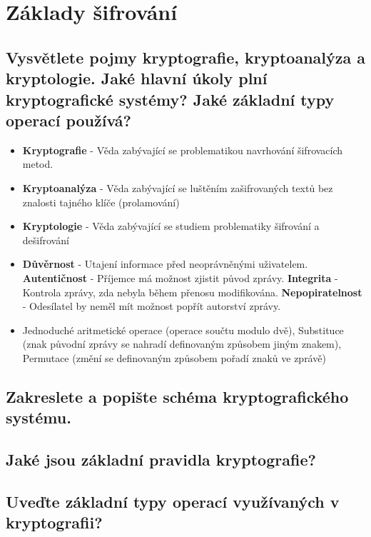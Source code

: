\clearpage
\section{Základy šifrování}
\subsection{Vysvětlete pojmy kryptografie, kryptoanalýza a kryptologie. Jaké hlavní úkoly plní kryptografické systémy? Jaké základní typy operací používá?}
\begin{itemize}
    \item \textbf{Kryptografie} - Věda zabývající se problematikou navrhování šifrovacích metod.
    \item \textbf{Kryptoanalýza} - Věda zabývající se luštěním zašifrovaných textů bez znalosti tajného klíče (prolamování)
    \item \textbf{Kryptologie} - Věda zabývající se studiem problematiky šifrování a dešifrování
    \item \textbf{Důvěrnost} - Utajení informace před neoprávněnými uživatelem. \textbf{Autentičnost} - Příjemce má možnost zjistit původ zprávy. \textbf{Integrita} - Kontrola zprávy, zda nebyla během přenosu modifikována. \textbf{Nepopiratelnost} - Odesílatel by neměl mít možnost popřít autorství zprávy.
    \item Jednoduché aritmetické operace (operace součtu modulo dvě), Substituce (znak původní zprávy se nahradí definovaným způsobem jiným znakem), Permutace (změní se definovaným způsobem pořadí znaků ve zprávě)
\end{itemize}

\subsection{Zakreslete a popište schéma kryptografického systému.}

\subsection{Jaké jsou základní pravidla kryptografie?}

\subsection{Uveďte základní typy operací využívaných v kryptografii?}

